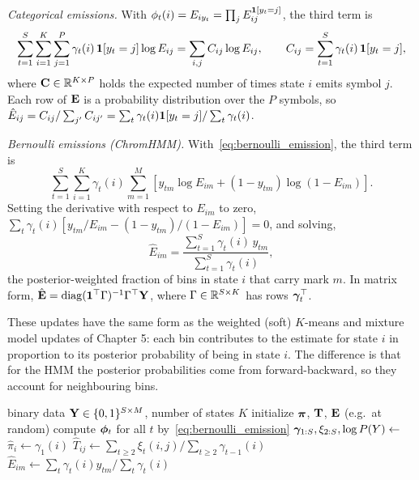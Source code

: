 \emph{Categorical emissions.} With $\phi_t(i)=E_{iy_t}=\prod_j E_{ij}^{\mathbf{1}[y_t=j]}$, the third term is
\begin{equation}
  \sum_{t=1}^S\sum_{i=1}^K\sum_{j=1}^P\gamma_t(i)\,\mathbf{1}[y_t=j]\log E_{ij} = \sum_{i,j}C_{ij}\log E_{ij},
  \qquad C_{ij}=\sum_{t=1}^S\gamma_t(i)\,\mathbf{1}[y_t=j],
\end{equation}
where $\mathbf{C}\in\mathbb{R}^{K\times P}$ holds the expected number of times state $i$ emits symbol $j$. Each row of $\mathbf{E}$ is a probability distribution over the $P$ symbols, so $\hat E_{ij}=C_{ij}/\sum_{j'}C_{ij'}=\sum_t\gamma_t(i)\mathbf{1}[y_t=j]/\sum_t\gamma_t(i)$.

\emph{Bernoulli emissions (ChromHMM).} With~\eqref{eq:bernoulli_emission}, the third term is
\begin{equation}
  \sum_{t=1}^S\sum_{i=1}^K\gamma_t(i)\sum_{m=1}^M\left[y_{tm}\log E_{im}+(1-y_{tm})\log(1-E_{im})\right].
\end{equation}
Setting the derivative with respect to $E_{im}$ to zero, $\sum_t\gamma_t(i)\left[y_{tm}/E_{im}-(1-y_{tm})/(1-E_{im})\right]=0$, and solving,
\begin{equation}
  \hat E_{im} = \frac{\sum_{t=1}^S\gamma_t(i)\,y_{tm}}{\sum_{t=1}^S\gamma_t(i)},
\end{equation}
the posterior-weighted fraction of bins in state $i$ that carry mark $m$. In matrix form, $\hat{\mathbf{E}}=\operatorname{diag}(\mathbf{1}^\top\Gamma)^{-1}\Gamma^\top\mathbf{Y}$, where $\Gamma\in\mathbb{R}^{S\times K}$ has rows $\boldsymbol{\gamma}_t^\top$.

These updates have the same form as the weighted (soft) $K$-means and mixture model updates of Chapter 5: each bin contributes to the estimate for state $i$ in proportion to its posterior probability of being in state $i$. The difference is that for the HMM the posterior probabilities come from forward-backward, so they account for neighbouring bins.

\begin{algorithm}[tbp]
  \caption{Baum-Welch (EM) for an HMM with Bernoulli emissions}
  \label{alg:bw}
  \begin{algorithmic}[1]
    \Require binary data $\mathbf{Y}\in\{0,1\}^{S\times M}$, number of states $K$
    \State initialize $\boldsymbol{\pi}$, $\mathbf{T}$, $\mathbf{E}$ (e.g.\ at random)
    \Repeat
      \State compute $\boldsymbol{\phi}_t$ for all $t$ by~\eqref{eq:bernoulli_emission}
      \State $\boldsymbol{\gamma}_{1:S},\xi_{2:S},\log P(Y)\gets$  
      \State $\hat\pi_i\gets\gamma_1(i)$ 
      \State $\hat T_{ij}\gets\sum_{t\geq 2}\xi_t(i,j)\big/\sum_{t\geq 2}\gamma_{t-1}(i)$
      \State $\hat E_{im}\gets\sum_t\gamma_t(i)y_{tm}\big/\sum_t\gamma_t(i)$
  \end{algorithmic}
\end{algorithm}

